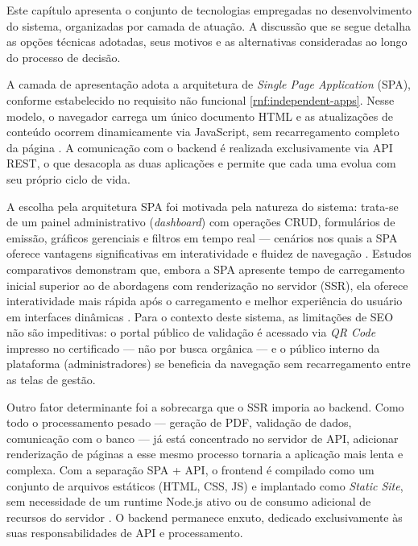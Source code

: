 
Este capítulo apresenta o conjunto de tecnologias empregadas no desenvolvimento do sistema, organizadas por camada de atuação. A discussão que se segue detalha as opções técnicas adotadas, seus motivos e as alternativas consideradas ao longo do processo de decisão.

\label{sec:tecnologias}

\label{sec:frontend}

A camada de apresentação adota a arquitetura de \textit{Single Page Application} (SPA), conforme estabelecido no requisito não funcional \ref{rnf:independent-apps}. Nesse modelo, o navegador carrega um único documento HTML e as atualizações de conteúdo ocorrem dinamicamente via JavaScript, sem recarregamento completo da página \cite{romanov2025, karka2025}. A comunicação com o backend é realizada exclusivamente via API REST, o que desacopla as duas aplicações e permite que cada uma evolua com seu próprio ciclo de vida.

A escolha pela arquitetura SPA foi motivada pela natureza do sistema: trata-se de um painel administrativo (\textit{dashboard}) com operações CRUD, formulários de emissão, gráficos gerenciais e filtros em tempo real --- cenários nos quais a SPA oferece vantagens significativas em interatividade e fluidez de navegação \cite{amin2022}. Estudos comparativos demonstram que, embora a SPA apresente tempo de carregamento inicial superior ao de abordagens com renderização no servidor (SSR), ela oferece interatividade mais rápida após o carregamento e melhor experiência do usuário em interfaces dinâmicas \cite{clapton2025}. Para o contexto deste sistema, as limitações de SEO não são impeditivas: o portal público de validação é acessado via \textit{QR Code} impresso no certificado --- não por busca orgânica --- e o público interno da plataforma (administradores) se beneficia da navegação sem recarregamento entre as telas de gestão.

Outro fator determinante foi a sobrecarga que o SSR imporia ao backend. Como todo o processamento pesado --- geração de PDF, validação de dados, comunicação com o banco --- já está concentrado no servidor de API, adicionar renderização de páginas a esse mesmo processo tornaria a aplicação mais lenta e complexa. Com a separação SPA + API, o frontend é compilado como um conjunto de arquivos estáticos (HTML, CSS, JS) e implantado como \textit{Static Site}, sem necessidade de um runtime Node.js ativo ou de consumo adicional de recursos do servidor \cite{vite2025}. O backend permanece enxuto, dedicado exclusivamente às suas responsabilidades de API e processamento.

